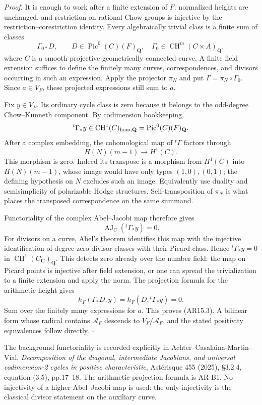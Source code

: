 \documentclass[11pt,a4paper]{article}
\begin{document}
\emph{Proof.} It is enough to work after a finite extension of \(F\):
normalized heights are unchanged, and restriction on rational Chow
groups is injective by the restriction--corestriction identity. Every
algebraically trivial class is a finite sum of classes \[
\Gamma_{0*}D,
\qquad D\in\operatorname{Pic}^0(C)(F)_{\mathbf Q},
\quad\Gamma_0\in\operatorname{CH}^m(C\times A)_{\mathbf Q},
\] where \(C\) is a smooth projective geometrically connected curve. A
finite field extension suffices to define the finitely many curves,
correspondences, and divisors occurring in such an expression. Apply the
projector \(\pi_N\) and put \(\Gamma=\pi_N\circ\Gamma_0\). Since
\(a\in V_F\), these projected expressions still sum to \(a\).

Fix \(y\in V_F\). Its ordinary cycle class is zero because it belongs to
the odd-degree Chow--Künneth component. By codimension bookkeeping, \[
{}^t\Gamma_*y\in\operatorname{CH}^1(C)_{\rm hom,\mathbf Q}
                   =\operatorname{Pic}^0(C)(F)_{\mathbf Q}.
\] After a complex embedding, the cohomological map of \({}^t\Gamma\)
factors through \[
H(N)(m-1)\longrightarrow H^1(C).
\] This morphism is zero. Indeed its transpose is a morphism from
\(H^1(C)\) into \(H(N)(m-1)\), whose image would have only types
\((1,0),(0,1)\); the defining hypothesis on \(N\) excludes such an
image. Equivalently use duality and semisimplicity of polarizable Hodge
structures. Self-transposition of \(\pi_N\) is what places the
transposed correspondence on the same summand.

Functoriality of the complex Abel--Jacobi map therefore gives \[
\operatorname{AJ}_C({}^t\Gamma_*y)=0.
\] For divisors on a curve, Abel's theorem identifies this map with the
injective identification of degree-zero divisor classes with their
Picard class. Hence \({}^t\Gamma_*y=0\) in
\(\operatorname{CH}^1(C_{\mathbf C})_{\mathbf Q}\). This detects zero
already over the number field: the map on Picard points is injective
after field extension, or one can spread the trivialization to a finite
extension and apply the norm. The projection formula for the arithmetic
height gives \[
h_F(\Gamma_*D,y)=h_F(D,{}^t\Gamma_*y)=0.
\] Sum over the finitely many expressions for \(a\). This proves
(AR15.3). A bilinear form whose radical contains \(\mathcal A_F\)
descends to \(V_F/\mathcal A_F\), and the stated positivity equivalences
follow directly. \(\square\)

The background functoriality is recorded explicitly in
Achter--Casalaina-Martin--Vial, \emph{Decomposition of the diagonal,
intermediate Jacobians, and universal codimension-2 cycles in positive
characteristic}, Astérisque 455 (2025), §3.2.4, equation (3.5),
pp.17--18. The arithmetic projection formula is AR-B1. No injectivity of
a higher Abel--Jacobi map is used: the only injectivity is the classical
divisor statement on the auxiliary curve.
\end{document}

